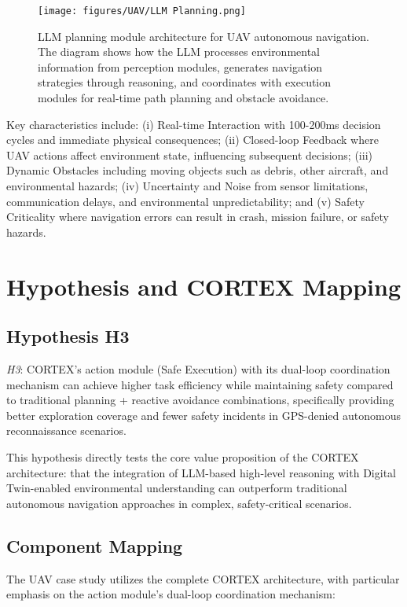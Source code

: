 \begin{figure}[htbp]
\centering
\texttt{[image: figures/UAV/LLM Planning.png]}
\caption{LLM planning module architecture for UAV autonomous navigation. The diagram shows how the LLM processes environmental information from perception modules, generates navigation strategies through reasoning, and coordinates with execution modules for real-time path planning and obstacle avoidance.}
\label{fig:llm_planning}
\end{figure}

Key characteristics include: (i) Real-time Interaction with 100-200ms decision cycles and immediate physical consequences; (ii) Closed-loop Feedback where UAV actions affect environment state, influencing subsequent decisions; (iii) Dynamic Obstacles including moving objects such as debris, other aircraft, and environmental hazards; (iv) Uncertainty and Noise from sensor limitations, communication delays, and environmental unpredictability; and (v) Safety Criticality where navigation errors can result in crash, mission failure, or safety hazards.

\section{Hypothesis and CORTEX Mapping}

\subsection{Hypothesis H3}

\emph{H3}: CORTEX's action module (Safe Execution) with its dual-loop coordination mechanism can achieve higher task efficiency while maintaining safety compared to traditional planning + reactive avoidance combinations, specifically providing better exploration coverage and fewer safety incidents in GPS-denied autonomous reconnaissance scenarios.

This hypothesis directly tests the core value proposition of the CORTEX architecture: that the integration of LLM-based high-level reasoning with Digital Twin-enabled environmental understanding can outperform traditional autonomous navigation approaches in complex, safety-critical scenarios.

\subsection{Component Mapping}

The UAV case study utilizes the complete CORTEX architecture, with particular emphasis on the action module's dual-loop coordination mechanism:

